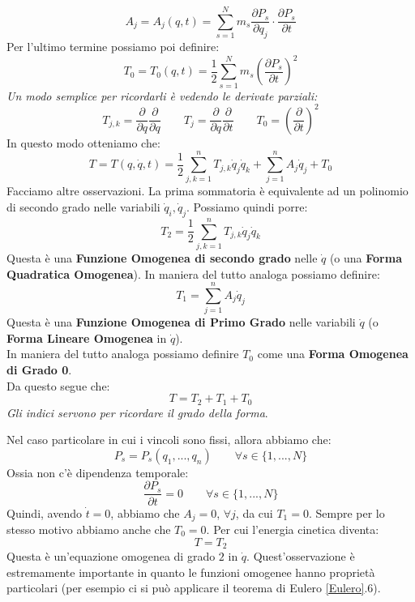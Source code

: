 \documentclass[11pt,a4paper,twoside]{article}
\theoremstyle{definition}
\begin{document}
\[ A_j = A_j(q,t) = \sum_{s=1}^N m_s \frac{\partial P_s}{\partial q_j}\cdot \frac{\partial P_s}{\partial t}\]
Per l'ultimo termine possiamo poi definire:
\[ T_0 = T_0 (q,t) = \frac 12 \sum_{s=1}^N m_s \left( \frac{\partial P_s}{\partial t} \right)^2 \]
\textit{Un modo semplice per ricordarli è vedendo le derivate parziali:}
\[ T_{j,k} = \frac{\partial}{\partial q}\frac{\partial}{\partial q}\qquad T_j = \frac{\partial}{\partial q} \frac{\partial}{\partial t} \qquad T_0 = \left(\frac \partial{\partial t}\right)^2 \]
In questo modo otteniamo che:
\[ T = T(q, \dot q, t) = \frac 12 \sum_{j,k =1}^n T_{j,k} \dot q_j \dot q_k + \sum_{j=1}^n A_j \dot q_j + T_0 \]
Facciamo altre osservazioni. La prima sommatoria è equivalente ad un polinomio di secondo grado nelle variabili $\dot q_i, \dot q_j$. Possiamo quindi porre:
\[ T_2 = \frac 12 \sum_{j,k=1}^n T_{j,k} \dot q_j \dot q_k \]
Questa è una \textbf{Funzione Omogenea di secondo grado} nelle $\dot q$ (o una \textbf{Forma Quadratica Omogenea}).
In maniera del tutto analoga possiamo definire:
\[ T_1 = \sum_{j=1}^n A_j \dot q_j\]
Questa è una \textbf{Funzione Omogenea di Primo Grado} nelle variabili $\dot q$ (o \textbf{Forma Lineare Omogenea} in $\dot q$).\\
In maniera del tutto analoga possiamo definire $T_0$ come una \textbf{Forma Omogenea di Grado 0}.\\
Da questo segue che:
\[ T = T_2 + T_1 + T_0\]
\textit{Gli indici servono per ricordare il grado della forma}.

Nel caso particolare in cui i vincoli sono fissi, allora abbiamo che:
\[ P_s = P_s(q_1,...,q_n) \qquad \forall s \in \{1,...,N\} \]
Ossia non c'è dipendenza temporale:
\[ \frac{\partial P_s}{\partial t} = 0 \qquad \forall s \in \{1,...,N\} \]
Quindi, avendo $\dot t = 0$, abbiamo che $A_j = 0$, $\forall j$, da cui $T_1 = 0$. Sempre per lo stesso motivo abbiamo anche che $T_0 = 0$. Per cui l'energia cinetica diventa:
\[ T = T_2 \]
Questa è un'equazione omogenea di grado $2$ in $\dot q$. Quest'osservazione è estremamente importante in quanto le funzioni omogenee hanno proprietà particolari (per esempio ci si può applicare il teorema di Eulero \ref{Eulero}.6).
\end{document}
